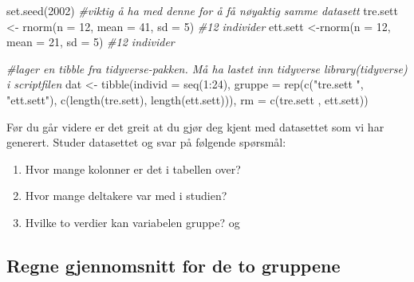 \documentclass[
]{book}
\newenvironment{Shaded}{\begin{snugshade}}{\end{snugshade}}
\newcommand{\AttributeTok}[1]{\textcolor[rgb]{0.77,0.63,0.00}{#1}}
\newcommand{\CommentTok}[1]{\textcolor[rgb]{0.56,0.35,0.01}{\textit{#1}}}
\newcommand{\DecValTok}[1]{\textcolor[rgb]{0.00,0.00,0.81}{#1}}
\newcommand{\FunctionTok}[1]{\textcolor[rgb]{0.00,0.00,0.00}{#1}}
\newcommand{\NormalTok}[1]{#1}
\newcommand{\OtherTok}[1]{\textcolor[rgb]{0.56,0.35,0.01}{#1}}
\newcommand{\SpecialCharTok}[1]{\textcolor[rgb]{0.00,0.00,0.00}{#1}}
\newcommand{\StringTok}[1]{\textcolor[rgb]{0.31,0.60,0.02}{#1}}
\providecommand{\tightlist}{%
  \setlength{\itemsep}{0pt}\setlength{\parskip}{0pt}}
\begin{document}
\begin{Shaded}
\begin{Highlighting}[]
\FunctionTok{set.seed}\NormalTok{(}\DecValTok{2002}\NormalTok{) }\CommentTok{\#viktig å ha med denne for å få nøyaktig samme datasett}
\NormalTok{tre.sett }\OtherTok{\textless{}{-}} \FunctionTok{rnorm}\NormalTok{(}\AttributeTok{n =} \DecValTok{12}\NormalTok{, }\AttributeTok{mean =} \DecValTok{41}\NormalTok{, }\AttributeTok{sd =} \DecValTok{5}\NormalTok{) }\CommentTok{\#12 individer}
\NormalTok{ett.sett }\OtherTok{\textless{}{-}}\FunctionTok{rnorm}\NormalTok{(}\AttributeTok{n =} \DecValTok{12}\NormalTok{, }\AttributeTok{mean =} \DecValTok{21}\NormalTok{, }\AttributeTok{sd =} \DecValTok{5}\NormalTok{) }\CommentTok{\#12 individer}

\CommentTok{\#lager en tibble fra tidyverse{-}pakken. Må ha lastet inn tidyverse library(tidyverse) i scriptfilen}
\NormalTok{dat }\OtherTok{\textless{}{-}} \FunctionTok{tibble}\NormalTok{(}\AttributeTok{individ =} \FunctionTok{seq}\NormalTok{(}\DecValTok{1}\SpecialCharTok{:}\DecValTok{24}\NormalTok{),}
              \AttributeTok{gruppe =} \FunctionTok{rep}\NormalTok{(}\FunctionTok{c}\NormalTok{(}\StringTok{"tre.sett "}\NormalTok{, }\StringTok{"ett.sett"}\NormalTok{), }\FunctionTok{c}\NormalTok{(}\FunctionTok{length}\NormalTok{(tre.sett), }\FunctionTok{length}\NormalTok{(ett.sett))),}
              \AttributeTok{rm =} \FunctionTok{c}\NormalTok{(tre.sett , ett.sett))}
\end{Highlighting}
\end{Shaded}

Før du går videre er det greit at du gjør deg kjent med datasettet som vi har generert. Studer datasettet og svar på følgende spørsmål:

\begin{enumerate}
\def\labelenumi{\arabic{enumi}.}
\tightlist
\item
  Hvor mange kolonner er det i tabellen over?
\item
  Hvor mange deltakere var med i studien?
\item
  Hvilke to verdier kan variabelen gruppe? og
\end{enumerate}

\hypertarget{regne-gjennomsnitt-for-de-to-gruppene}{%
\subsection{Regne gjennomsnitt for de to gruppene}\label{regne-gjennomsnitt-for-de-to-gruppene}}
\end{document}
